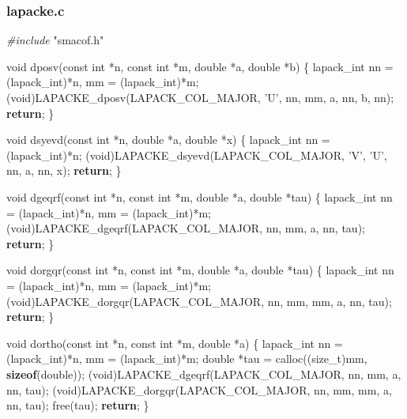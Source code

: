 \documentclass[12pt,]{article}
\newenvironment{Shaded}{\begin{snugshade}}{\end{snugshade}}
\newcommand{\KeywordTok}[1]{\textcolor[rgb]{0.13,0.29,0.53}{\textbf{#1}}}
\newcommand{\DataTypeTok}[1]{\textcolor[rgb]{0.13,0.29,0.53}{#1}}
\newcommand{\CharTok}[1]{\textcolor[rgb]{0.31,0.60,0.02}{#1}}
\newcommand{\ImportTok}[1]{#1}
\newcommand{\ControlFlowTok}[1]{\textcolor[rgb]{0.13,0.29,0.53}{\textbf{#1}}}
\newcommand{\PreprocessorTok}[1]{\textcolor[rgb]{0.56,0.35,0.01}{\textit{#1}}}
\newcommand{\NormalTok}[1]{#1}
\begin{document}
\subsubsection{lapacke.c}\label{lapacke.c}

\begin{Shaded}
\begin{Highlighting}[]
\PreprocessorTok{#include }\ImportTok{"smacof.h"}

\DataTypeTok{void}\NormalTok{ dposv(}\DataTypeTok{const} \DataTypeTok{int}\NormalTok{ *n, }\DataTypeTok{const} \DataTypeTok{int}\NormalTok{ *m, }\DataTypeTok{double}\NormalTok{ *a, }\DataTypeTok{double}\NormalTok{ *b) \{}
\NormalTok{    lapack_int nn = (lapack_int)*n, mm = (lapack_int)*m;}
\NormalTok{    (}\DataTypeTok{void}\NormalTok{)LAPACKE_dposv(LAPACK_COL_MAJOR, }\CharTok{'U'}\NormalTok{, nn, mm, a, nn, b, nn);}
    \ControlFlowTok{return}\NormalTok{;}
\NormalTok{\}}

\DataTypeTok{void}\NormalTok{ dsyevd(}\DataTypeTok{const} \DataTypeTok{int}\NormalTok{ *n, }\DataTypeTok{double}\NormalTok{ *a, }\DataTypeTok{double}\NormalTok{ *x) \{}
\NormalTok{    lapack_int nn = (lapack_int)*n;}
\NormalTok{    (}\DataTypeTok{void}\NormalTok{)LAPACKE_dsyevd(LAPACK_COL_MAJOR, }\CharTok{'V'}\NormalTok{, }\CharTok{'U'}\NormalTok{, nn, a, nn, x);}
    \ControlFlowTok{return}\NormalTok{;}
\NormalTok{\}}

\DataTypeTok{void}\NormalTok{ dgeqrf(}\DataTypeTok{const} \DataTypeTok{int}\NormalTok{ *n, }\DataTypeTok{const} \DataTypeTok{int}\NormalTok{ *m, }\DataTypeTok{double}\NormalTok{ *a, }\DataTypeTok{double}\NormalTok{ *tau) \{}
\NormalTok{    lapack_int nn = (lapack_int)*n, mm = (lapack_int)*m;}
\NormalTok{    (}\DataTypeTok{void}\NormalTok{)LAPACKE_dgeqrf(LAPACK_COL_MAJOR, nn, mm, a, nn, tau);}
    \ControlFlowTok{return}\NormalTok{;}
\NormalTok{\}}

\DataTypeTok{void}\NormalTok{ dorgqr(}\DataTypeTok{const} \DataTypeTok{int}\NormalTok{ *n, }\DataTypeTok{const} \DataTypeTok{int}\NormalTok{ *m, }\DataTypeTok{double}\NormalTok{ *a, }\DataTypeTok{double}\NormalTok{ *tau) \{}
\NormalTok{    lapack_int nn = (lapack_int)*n, mm = (lapack_int)*m;}
\NormalTok{    (}\DataTypeTok{void}\NormalTok{)LAPACKE_dorgqr(LAPACK_COL_MAJOR, nn, mm, mm, a, nn, tau);}
    \ControlFlowTok{return}\NormalTok{;}
\NormalTok{\}}

\DataTypeTok{void}\NormalTok{ dortho(}\DataTypeTok{const} \DataTypeTok{int}\NormalTok{ *n, }\DataTypeTok{const} \DataTypeTok{int}\NormalTok{ *m, }\DataTypeTok{double}\NormalTok{ *a) \{}
\NormalTok{    lapack_int nn = (lapack_int)*n, mm = (lapack_int)*m;}
    \DataTypeTok{double}\NormalTok{ *tau = calloc((}\DataTypeTok{size_t}\NormalTok{)mm, }\KeywordTok{sizeof}\NormalTok{(}\DataTypeTok{double}\NormalTok{));}
\NormalTok{    (}\DataTypeTok{void}\NormalTok{)LAPACKE_dgeqrf(LAPACK_COL_MAJOR, nn, mm, a, nn, tau);}
\NormalTok{    (}\DataTypeTok{void}\NormalTok{)LAPACKE_dorgqr(LAPACK_COL_MAJOR, nn, mm, mm, a, nn, tau);}
\NormalTok{    free(tau);}
    \ControlFlowTok{return}\NormalTok{;}
\NormalTok{\}}
\end{Highlighting}
\end{Shaded}
\end{document}
